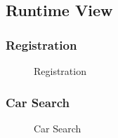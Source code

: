 \documentclass[english]{article}
\begin{document}
\newpage
\subsection{Runtime View}

\subsubsection{Registration}
\begin{figure}[H]
	\centering
	\caption{Registration}
	\label{seq_registration}
\end{figure}

\subsubsection{Car Search}
\begin{figure}[H]
	\centering
	\makebox[\textwidth][c]{
		\def\svgwidth{450pt}
		
	}
	\caption{Car Search}
	\label{seq_carsearch}
\end{figure}
\end{document}
